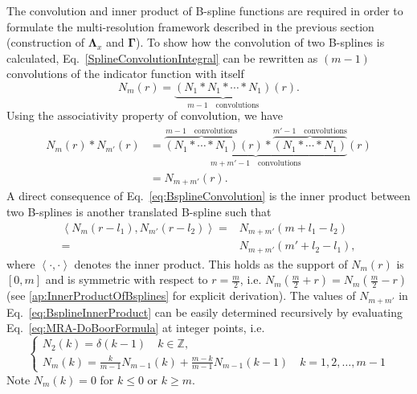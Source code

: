\documentclass[review,authoryear,3p]{elsarticle}
\begin{document}
The convolution and inner product of B-spline functions are required in order to formulate the multi-resolution framework described in the previous section (construction of $\boldsymbol\Lambda_{x}$ and $\boldsymbol\Gamma$). To show how the convolution of two B-splines is calculated, Eq.~\eqref{SplineConvolutionIntegral} can be rewritten as $(m-1)$ convolutions of the indicator function with itself
\begin{equation}\label{eq:N1convolutions}
 N_{m}\left(r\right)=\underbrace{\left(N_{1}\ast N_{1}\ast \cdots \ast N_{1}\right)}_{m-1\quad \text{convolutions}}\left(r\right).
\end{equation}
Using the associativity property of convolution, we have
\setlength{\arraycolsep}{0.0em}
\begin{align}\label{eq:BsplineConvolution}
N_{m}\left( r\right) \ast N_{m'}\left(r\right)&=\underbrace{\overbrace{\left(N_{1} \ast \cdots \ast N_{1}\right)}^{m-1 \quad \text{convolutions}}\left(r\right) \ast \overbrace{\left(N_{1} \ast \cdots \ast N_{1}\right)}^{m'-1\quad \text{convolutions}}}_{m+m'-1 \quad \text{convolutions}}\left(r\right)\nonumber\\
&=N_{m+m'}\left(r\right).
\end{align}
A direct consequence of Eq.~\eqref{eq:BsplineConvolution} is the inner product between two B-splines is another translated B-spline such that
\begin{align}
 \left\langle N_{m}\left(r-l_{1}\right), N_{m'}\left(r-l_{2}\right)\right\rangle=&N_{m+m'}\left(m+l_{1}-l_{2}\right)\nonumber \\
=&N_{m+m'}\left(m'+l_{2}-l_{1}\right),
\label{eq:BsplineInnerProduct}
\end{align}
where $\left\langle \cdot,\cdot\right\rangle $ denotes the inner product. This holds as the support of $N_m\left(r\right)$ is $\left[ 0,m\right]$ and  is symmetric with respect to $r=\frac{m}{2}$, i.e. $ N_{m}\left(\frac{m}{2}+r\right)=N_{m}\left(\frac{m}{2}-r\right)$ (see \ref{ap:InnerProductOfBsplines} for explicit derivation). The values of $N_{m+m'}$ in Eq.~\eqref{eq:BsplineInnerProduct} can be easily determined recursively by evaluating Eq.~\eqref{eq:MRA-DoBoorFormula} at integer points, i.e.
 \begin{equation}\label{eq:MRA-recursiveBsplineatintegerpoints}
 \begin{cases}
 N_2(k)=\delta(k-1)\quad k\in \mathbb{Z}, \\
 N_{m}\left(k\right)=\frac{k}{m-1}N_{m-1}\left(k\right)+\frac{m-k}{m-1}N_{m-1}\left(k-1\right) \quad k=1,2,\dots,m-1
  \end{cases}
 \end{equation}
Note $N_{m}\left(k\right)=0$ for $k\le0$ or $k\ge m$. 
\end{document}
